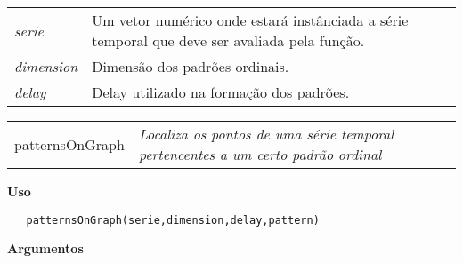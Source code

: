 \documentclass[12pt,letterpaper]{article}
\begin{document}
\begin{table}[!h]
\begin{center}
\begin{tabularx}{\textwidth}{X X}
\hspace{0.5cm} \textit{serie} \vspace{0.5cm}& Um vetor numérico onde estará instânciada a série temporal que deve ser avaliada pela função.\vspace{0.5cm}\\
\hspace{0.5cm} \textit{dimension} \vspace{0.5cm}& Dimensão dos padrões ordinais.\vspace{0.5cm}\\
\hspace{0.5cm} \textit{delay} \vspace{0.5cm}& Delay utilizado na formação dos padrões.\vspace{0.5cm}\\
\end{tabularx}
\end{center}
\end{table} 

\newpage

\hrulefill   

\begin{table}[!h]
\begin{center}
\begin{tabularx}{\textwidth}{ X X}
\hspace{0.5cm} patternsOnGraph & \textit{Localiza os pontos de uma série temporal pertencentes a um certo padrão ordinal}
\end{tabularx}
\end{center}
\end{table} 

\vspace{-0.5cm}

\hrulefill  

\vspace{0.5cm}

\textbf{Uso}

\begin{lstlisting}
   patternsOnGraph(serie,dimension,delay,pattern)
\end{lstlisting}

\vspace{0.5cm}

\textbf{Argumentos}
\end{document}
